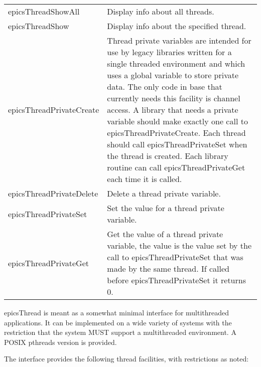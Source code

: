 \begin{center}
\begin{longtable}{p{2.375in}p{5.0in}}
epicsThreadShowAll & Display info about all threads.\\
epicsThreadShow & Display info about the specified thread.\\
epicsThreadPrivateCreate & Thread private variables are intended for use by legacy libraries written for a single threaded environment and which uses a global variable to store private data. The only code in base that currently needs this facility is channel access. A library that needs a private variable should make exactly one call to epicsThreadPrivateCreate. Each thread should call epicsThreadPrivateSet when the thread is created. Each library routine can call epicsThreadPrivateGet each time it is called.\\
epicsThreadPrivateDelete & Delete a thread private variable.\\
epicsThreadPrivateSet & Set the value for a thread private variable. \\
epicsThreadPrivateGet & Get the value of a thread private variable, the value is the value set by the call to epicsThreadPrivateSet that was made by the same thread. If called before epicsThreadPrivateSet it returns 0.
\end{longtable}\end{center}


epicsThread is meant as a somewhat minimal interface for multithreaded applications. It can be implemented on a wide 
variety of systems with the restriction that the system MUST support a multithreaded environment. A POSIX pthreads 
version is provided.

The interface provides the following thread facilities, with restrictions as noted:

